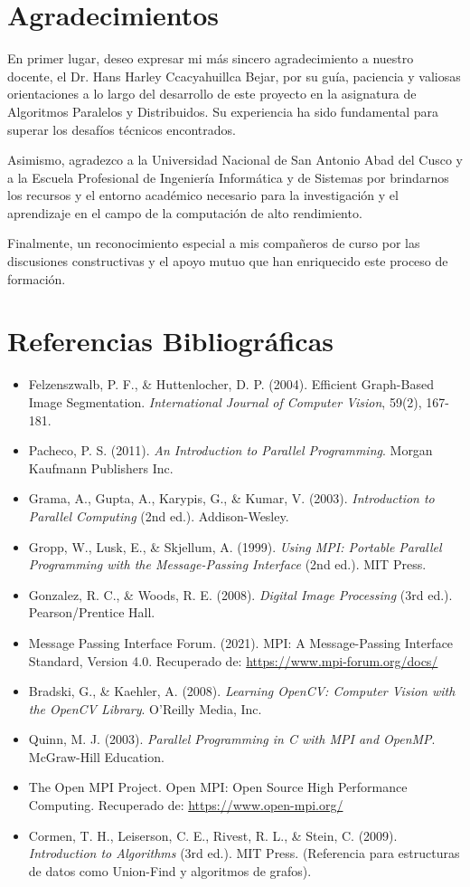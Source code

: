 \documentclass[fleqn,10pt]{article}
\begin{document}
\clearpage
\section*{Agradecimientos}
En primer lugar, deseo expresar mi más sincero agradecimiento a nuestro docente, el Dr. Hans Harley Ccacyahuillca Bejar, por su guía, paciencia y valiosas orientaciones a lo largo del desarrollo de este proyecto en la asignatura de Algoritmos Paralelos y Distribuidos. Su experiencia ha sido fundamental para superar los desafíos técnicos encontrados.

Asimismo, agradezco a la Universidad Nacional de San Antonio Abad del Cusco y a la Escuela Profesional de Ingeniería Informática y de Sistemas por brindarnos los recursos y el entorno académico necesario para la investigación y el aprendizaje en el campo de la computación de alto rendimiento.

Finalmente, un reconocimiento especial a mis compañeros de curso por las discusiones constructivas y el apoyo mutuo que han enriquecido este proceso de formación.

\clearpage
\section*{Referencias Bibliográficas}
\begin{itemize}
    \item Felzenszwalb, P. F., \& Huttenlocher, D. P. (2004). Efficient Graph-Based Image Segmentation. \textit{International Journal of Computer Vision}, 59(2), 167-181.
    \item Pacheco, P. S. (2011). \textit{An Introduction to Parallel Programming}. Morgan Kaufmann Publishers Inc.
    \item Grama, A., Gupta, A., Karypis, G., \& Kumar, V. (2003). \textit{Introduction to Parallel Computing} (2nd ed.). Addison-Wesley.
    \item Gropp, W., Lusk, E., \& Skjellum, A. (1999). \textit{Using MPI: Portable Parallel Programming with the Message-Passing Interface} (2nd ed.). MIT Press.
    \item Gonzalez, R. C., \& Woods, R. E. (2008). \textit{Digital Image Processing} (3rd ed.). Pearson/Prentice Hall.
    \item Message Passing Interface Forum. (2021). MPI: A Message-Passing Interface Standard, Version 4.0. Recuperado de: \url{https://www.mpi-forum.org/docs/}
    \item Bradski, G., \& Kaehler, A. (2008). \textit{Learning OpenCV: Computer Vision with the OpenCV Library}. O'Reilly Media, Inc.
    \item Quinn, M. J. (2003). \textit{Parallel Programming in C with MPI and OpenMP}. McGraw-Hill Education.
    \item The Open MPI Project. Open MPI: Open Source High Performance Computing. Recuperado de: \url{https://www.open-mpi.org/}
    \item Cormen, T. H., Leiserson, C. E., Rivest, R. L., \& Stein, C. (2009). \textit{Introduction to Algorithms} (3rd ed.). MIT Press. (Referencia para estructuras de datos como Union-Find y algoritmos de grafos).
\end{itemize}
\end{document}
